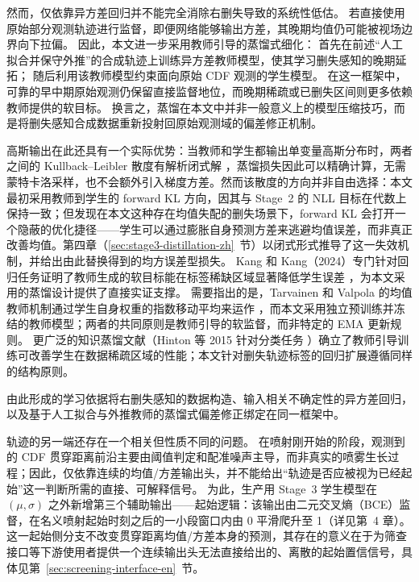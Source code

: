 然而，仅依靠异方差回归并不能完全消除右删失导致的系统性低估。
若直接使用原始部分观测轨迹进行监督，即便网络能够输出方差，其晚期均值仍可能被视场边界向下拉偏。
因此，本文进一步采用教师引导的蒸馏式细化：
首先在前述``人工拟合并保守外推''的合成轨迹上训练异方差教师模型，使其学习删失感知的晚期延拓；
随后利用该教师模型约束面向原始 CDF 观测的学生模型。
在这一框架中，可靠的早中期原始观测仍保留直接监督地位，而晚期稀疏或已删失区间则更多依赖教师提供的软目标。
换言之，蒸馏在本文中并非一般意义上的模型压缩技巧，而是将删失感知合成数据重新投射回原始观测域的偏差修正机制。

高斯输出在此还具有一个实际优势：当教师和学生都输出单变量高斯分布时，两者之间的 Kullback--Leibler 散度有解析闭式解 \cite{BishopPRML2006,KendallGal2017}，蒸馏损失因此可以精确计算，无需蒙特卡洛采样，也不会额外引入梯度方差。然而该散度的方向并非自由选择：本文最初采用教师到学生的 forward KL 方向，因其与 Stage~2 的 NLL 目标在代数上保持一致；但发现在本文这种存在均值失配的删失场景下，forward KL 会打开一个隐蔽的优化捷径——学生可以通过膨胀自身预测方差来逃避均值误差，而非真正改善均值。第四章（\ref{sec:stage3-distillation-zh}~节）以闭式形式推导了这一失效机制，并给出由此替换得到的均方误差型损失。
Kang 和 Kang（2024）专门针对回归任务证明了教师生成的软目标能在标签稀缺区域显著降低学生误差 \cite{KangKang2024KDRegression}，为本文采用的蒸馏设计提供了直接实证支撑。
需要指出的是，Tarvainen 和 Valpola 的均值教师机制通过学生自身权重的指数移动平均来运作 \cite{TarvainenValpola2017}，而本文采用独立预训练并冻结的教师模型；两者的共同原则是教师引导的软监督，而非特定的 EMA 更新规则。
更广泛的知识蒸馏文献（Hinton 等 2015 针对分类任务 \cite{HintonVinyalsDean2015}）确立了教师引导训练可改善学生在数据稀疏区域的性能；本文针对删失轨迹标签的回归扩展遵循同样的结构原则。

由此形成的学习依据将右删失感知的数据构造、输入相关不确定性的异方差回归，以及基于人工拟合与外推教师的蒸馏式偏差修正绑定在同一框架中。

轨迹的另一端还存在一个相关但性质不同的问题。
在喷射刚开始的阶段，观测到的 CDF 贯穿距离前沿主要由阈值判定和配准噪声主导，而非真实的喷雾生长过程；因此，仅依靠连续的均值/方差输出头，并不能给出``轨迹是否应被视为已经起始''这一判断所需的直接、可解释信号。
为此，生产用 Stage~3 学生模型在 \((\mu,\sigma)\) 之外新增第三个辅助输出——起始逻辑：该输出由二元交叉熵（BCE）监督，在名义喷射起始时刻之后的一小段窗口内由 0 平滑爬升至 1（详见第~4 章）。
这一起始侧分支不改变贯穿距离均值/方差本身的预测，其存在的意义在于为筛查接口等下游使用者提供一个连续输出头无法直接给出的、离散的起始置信信号，具体见第~\ref{sec:screening-interface-en}~节。

